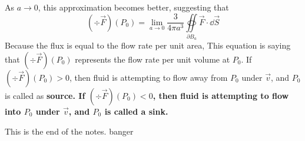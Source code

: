 As $a\to 0$, this approximation becomes better, suggesting that
\[ (\div \vec F)(P_0) = \lim_{a\to 0}\frac{3}{4\pi a^3}\oiint\limits_{\partial B_a}\vec F\cdot \dd \vec S\]
Because the flux is equal to the flow rate per unit area, This equation is saying that $(\div \vec F)(P_0)$ represents the flow rate per unit volume at $P_0$. If $(\div \vec F)(P_0)>0$, then fluid is attempting to flow away from $P_0$ under $\vec v$, and $P_0$ is called as \bf{source}. If $(\div \vec F)(P_0)<0$, then fluid is attempting to flow into $P_0$ under $\vec v$, and $P_0$ is called a \bf{sink}. \par
This is the end of the notes. banger

